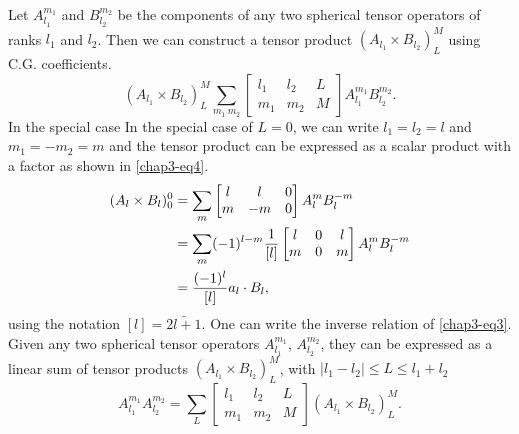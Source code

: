 Let $A_{l_1}^{m_1}$ and $B_{l_2}^{m_2}$ be the components of any two spherical tensor operators of ranks $l_1$ and $l_2$. Then we can construct a tensor product $(A_{l_1} \times B_{l_2})^M_L$ using C.G. coefficients.
\begin{equation}
(A_{l_1} \times B_{l_2})^M_L \sum_{m_1 ~m_2} 
\begin{bmatrix}
  l_1 & l_2 & L\\
  m_1 & m_2 & M
\end{bmatrix}
A_{l_1}^{m_1} B_{l_2}^{m_2}.  \label{chap3-eq3}
\end{equation}
In the special case In the special case of $L = 0$, we can write $l_1 = l_2 = l$ and $m_1 = −m_2 = m$ and the
tensor product can be expressed as a scalar product with a factor as shown in \eqref{chap3-eq4}.
\begin{align}
  (A_l \times B_l)^0_0 & = \sum_{m}
  \begin{bmatrix}  l & l & 0\\    m & -m & 0  \end{bmatrix}  A_l^m B_l^{-m}\notag\\
  & = \sum_m (-1)^{l-m} \frac{1}{[l]}
  \begin{bmatrix}    l & 0 & l\\    m & 0 & m  \end{bmatrix}  A_l^m B_l^{-m}\notag\\
  & = \frac{(-1)^l}{[l]} a_l \cdot B_l, \label{chap3-eq4}
\end{align}
using the notation $[l] = \bar{2l + 1}$. One can write the inverse relation of \eqref{chap3-eq3}. Given any two spherical tensor operators $A_{l_1}^{m_1}$, $A_{l_2}^{m_2}$, they can be expressed as a linear sum of tensor products $(A_{l_1} \times B_{l_2})^M_L$, with $|l_1 − l_2 | \leq L \leq l_1 + l_2$ 
\begin{equation}
A_{l_1}^{m_1} A_{l_2}^{m_2} = \sum_{L} 
\begin{bmatrix}
l_1 & l_2 &L\\
m_1 & m_2 & M
\end{bmatrix} (A_{l_1} \times B_{l_2})^M_L. \label{chap3-eq5}
\end{equation}

